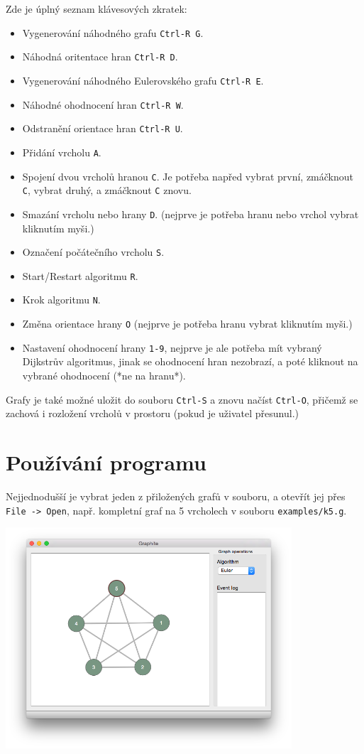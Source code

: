 \documentclass{article}
\def\code#1{\texttt{#1}}
\begin{document}
Zde je úplný seznam klávesových zkratek:

\begin{itemize}
  \item Vygenerování náhodného grafu \code{Ctrl-R G}.
  \item Náhodná oritentace hran \code{Ctrl-R D}.
  \item Vygenerování náhodného Eulerovského grafu \code{Ctrl-R E}.
  \item Náhodné ohodnocení hran \code{Ctrl-R W}.
  \item Odstranění orientace hran \code{Ctrl-R U}.
  \item Přidání vrcholu \code{A}.
  \item Spojení dvou vrcholů hranou \code{C}. Je potřeba napřed vybrat první, zmáčknout \code{C}, vybrat druhý, a zmáčknout \code{C} znovu.
  \item Smazání vrcholu nebo hrany \code{D}. (nejprve je potřeba hranu nebo vrchol vybrat kliknutím myši.)
  \item Označení počátečního vrcholu \code{S}.
  \item Start/Restart algoritmu \code{R}.
  \item Krok algoritmu \code{N}.
  \item Změna orientace hrany \code{O} (nejprve je potřeba hranu vybrat kliknutím myši.)
  \item Nastavení ohodnocení hrany \code{1-9}, nejprve je ale potřeba mít vybraný Dijkstrův algoritmus, jinak se ohodnocení hran nezobrazí, a poté kliknout na vybrané ohodnocení (*ne na hranu*).
\end{itemize}

Grafy je také možné uložit do souboru \code{Ctrl-S} a znovu načíst \code{Ctrl-O},
přičemž se zachová i rozložení vrcholů v prostoru (pokud je uživatel
přesunul.)

\pagebreak

\section{Používání programu}

Nejjednodušší je vybrat jeden z přiložených grafů v souboru, a otevřít
jej přes \code{File -> Open}, např. kompletní graf na 5 vrcholech v souboru
\code{examples/k5.g}.

\begin{center}
	\includegraphics[width=0.8\textwidth]{iYrD1VK.png}	
\end{center}
\end{document}
